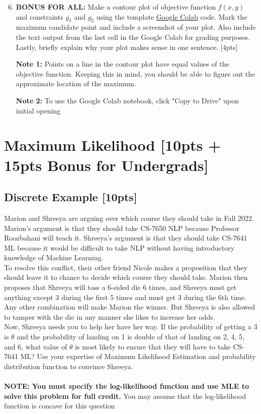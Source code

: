 \documentclass{article}
\begin{document}
\newpage
\begin{enumerate}[label=(\alph*)]
    \setcounter{enumi}{5}
    \item \textbf{BONUS FOR ALL:} Make a contour plot of objective function $f(x,y)$ and constraints $g_1$ and $g_2$ using the template \href{https://colab.research.google.com/drive/1DZxRYuurOwEq5S1_-QeFke2lpiNxAeg4?usp=sharing}{Google Colab} code. Mark the maximum candidate point and include a screenshot of your plot. Also include the text output from the last cell in the Google Colab for grading purposes. Lastly, briefly explain why your plot makes sense in one sentence. [4pts]
        \par\textbf{Note 1:} Points on a line in the contour plot have equal values of the objective function. Keeping this in mind, you should be able to figure out the approximate location of the maximum.
        \par\textbf{Note 2:} To use the Google Colab notebook, click "Copy to Drive" upon initial opening
\end{enumerate}


\newpage
\section{Maximum Likelihood [10pts + 15pts Bonus for Undergrads]}
\subsection{Discrete Example [10pts]}
Marion and Shreeya are arguing over which course they should take in Fall 2022. Marion’s argument is that they should take CS-7650 NLP because Professor Roozbahani will teach it. Shreeya’s argument is that they should take CS-7641 ML because it would be difficult to take NLP without having introductory knowledge of Machine Learning.\\

\noindent To resolve this conflict, their other friend Nicole makes a proposition that they should leave it to chance to decide which course they should take. Marion then proposes that Shreeya will toss a 6-sided die 6 times, and Shreeya must get anything except 3 during the first 5 times and must get 3 during the 6th time. Any other combination will make Marion the winner. But Shreeya is also allowed to tamper with the die in any manner she likes to increase her odds.\\

\noindent Now, Shreeya needs you to help her have her way. If the probability of getting a 3 is $\theta$ and the probability of landing on 1 is double of that of landing on 2, 4, 5, and 6, what value of $\theta$ is most likely to ensure that they will have to take CS-7641 ML? Use your expertise of Maximum Likelihood Estimation and probability distribution function to convince Shreeya.\\\\\textbf{NOTE: } \textbf{You must specify the log-likelihood function and use MLE to solve this problem for full credit.} You may assume that the log-likelihood function is concave for this question \\\\
\end{document}
